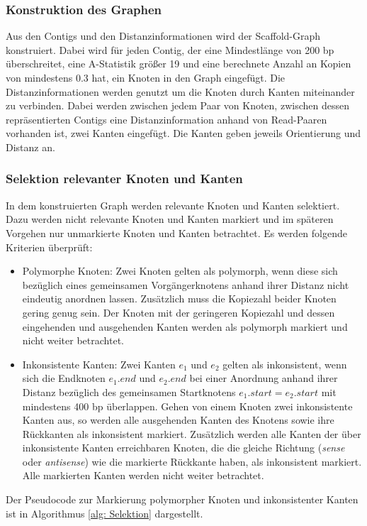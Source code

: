 \documentclass[a4paper,11pt,parskip,abstract=on]{scrartcl}
\begin{document}
\subsubsection{Konstruktion des Graphen}
Aus den Contigs und den Distanzinformationen wird der Scaffold-Graph
konstruiert. Dabei wird für jeden Contig, der eine Mindestlänge von
200 bp überschreitet, eine A-Statistik größer 19 und eine berechnete
Anzahl an Kopien von mindestens \num{0.3} hat, ein Knoten in den Graph
eingefügt. Die Distanzinformationen werden genutzt um die Knoten durch
Kanten miteinander zu verbinden. Dabei werden zwischen jedem Paar von
Knoten, zwischen dessen repräsentierten Contigs eine
Distanzinformation anhand von Read-Paaren vorhanden ist, zwei Kanten
eingefügt. Die Kanten geben jeweils Orientierung und Distanz an.

\subsubsection{Selektion relevanter Knoten und Kanten}
In dem konstruierten Graph werden relevante Knoten und Kanten
selektiert. Dazu werden nicht relevante Knoten und Kanten markiert und
im späteren Vorgehen nur unmarkierte Knoten und Kanten betrachtet. Es
werden folgende Kriterien überprüft:
\begin{itemize}
\item Polymorphe Knoten: Zwei Knoten gelten als polymorph, wenn diese
  sich bezüglich eines gemeinsamen Vorgängerknotens anhand ihrer
  Distanz nicht eindeutig anordnen lassen. Zusätzlich muss die
  Kopiezahl beider Knoten gering genug sein. Der Knoten mit der
  geringeren Kopiezahl und dessen eingehenden und ausgehenden Kanten
  werden als polymorph markiert und nicht weiter betrachtet.
\item Inkonsistente Kanten: Zwei Kanten $e_1$ und $e_2$ gelten als
  inkonsistent, wenn sich die Endknoten $e_1.end$ und $e_2.end$ bei
  einer Anordnung anhand ihrer Distanz bezüglich des gemeinsamen
  Startknotens $e_1.start = e_2.start$ mit mindestens 400 bp
  überlappen. Gehen von einem Knoten zwei inkonsistente Kanten aus, so
  werden alle ausgehenden Kanten des Knotens sowie ihre Rückkanten als
  inkonsistent markiert. Zusätzlich werden alle Kanten der über
  inkonsistente Kanten erreichbaren Knoten, die die gleiche Richtung
  (\textit{sense} oder \textit{antisense}) wie die markierte Rückkante
  haben, als inkonsistent markiert. Alle markierten Kanten werden
  nicht weiter betrachtet.
\end{itemize}
Der Pseudocode zur Markierung polymorpher Knoten und inkonsistenter
Kanten ist in Algorithmus \ref{alg: Selektion} dargestellt.
\end{document}
